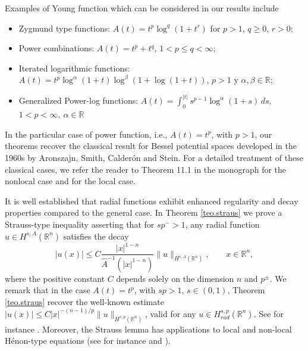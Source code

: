 \documentclass[leqno,twoside, 12pt]{amsart}
\theoremstyle{plain}
\numberwithin{equation}{section} \numberwithin{figure}{section}
\theoremstyle{definition}
\newcommand{\R}{\mathbb R}
\numberwithin{equation}{section}
\begin{document}
Examples of Young function which can be considered in our results include
\begin{itemize}
\item Zygmund type functions: $A(t)=t^p\log^q (1+t^r)$ for $p>1$, $q\geq 0$, $r>0$;
\item Power combinations: $A(t)=t^p + t^q$, $1<p\leq q <\infty$;
\item Iterated logarithmic functions: $A(t) = t^p \log^\alpha(1 + t) \log^\beta(1 + \log(1 + t))$,  $p > 1$ y $\alpha, \beta \in \mathbb{R}$;
\item  Generalized Power-log functions: $A(t) = \int_0^{|t|} s^{p-1} \log^\alpha(1+s) \, ds$, $1 < p < \infty, \ \alpha \in \mathbb{R}$
\end{itemize}  


In the particular case of power function, i.e., $A(t)=t^p$, with $p> 1$, our theorems recover the classical result for Bessel potential spaces developed in the 1960s by Aronszajn, Smith,  Calder\'on and Stein. For a detailed treatment of these classical cases, we refer the reader to Theorem 11.1 in the monograph \cite{AS} for the nonlocal case and \cite[Theorem p. 88]{Triebel} for the local case.


It is well established that radial functions exhibit enhanced regularity and decay properties compared to the general case. In Theorem \ref{teo.straus} we prove a Strauss-type inequality  asserting that for $ sp^->1$, any radial function $u \in H^{s,A}(\mathbb{R}^n)$ satisfies the decay
$$
|u(x)|\leq C \frac{|x|^{1-n}}{\hat A^{-1}(|x|^{1-n})} \|u\|_{H^{s,A}(\R^n)}, \qquad x\in\R^n,
$$
where the positive constant $C$ depends solely on the dimension $n$ and $p^\pm$. We remark that in the case $A(t)=t^p$, with $sp>1$, $s\in (0,1)$, Theorem \ref{teo.straus} recover the well-known estimate $|u(x)|\leq C|x|^{-(n-1)/p}\|u\|_{H^{s,p}(\R^n)}$, valid for any $u\in H^{s,p}_{rad}(\R^n)$. See for instance \cite{EP}. Moreover, the Strauss lemma has applications to local and non-local H\'enon-type equations (see for instance \cite{OS1} and \cite{OS2}).
\end{document}
